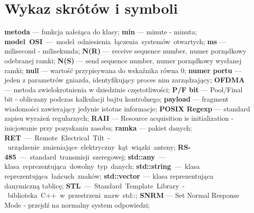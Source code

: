 \chapter*{Wykaz skrótów i symboli}
\noindent
\textbf{metoda} --- funkcja należąca do klasy;\newline
\textbf{min} --- minute - minuta;\newline
\textbf{model OSI} --- model odniesienia łączenia systemów otwartych;\newline
\textbf{ms} --- milisecond - milisekunda;\newline
\textbf{N(R)} --- receive sequence number, numer porządkowy odebranej ramki;\newline
\textbf{N(S)} --- send sequence number, numer porządkowy wysłanej ramki;\newline
\textbf{null} --- wartość przypisywana do wskaźnika równa 0;\newline
\textbf{numer portu} --- jeden z parametrów gniazda, identyfikujący proces nim zarządzający;\newline
\textbf{OFDMA} --- metoda zwielokrotnienia w dziedzinie częstotliwości;\newline
\textbf{P/F bit} --- Pool/Final bit - obliczany podczas kalkulacji bajtu kontrolnego;\newline
\textbf{payload} --- fragment wiadomości zawierający jedynie istotne informacje;\newline
\textbf{POSIX Regexp} --- standard zapisu wyrażeń regularnych;\newline
\textbf{RAII} --- Resource acquisition is initialization - inicjowanie przy pozyskaniu zasobu;\newline
\textbf{ramka} --- pakiet danych;\newline
\textbf{RET} --- Remote Electrical Tilt - urządzenie zmieniające elektryczny kąt wiązki anteny;\newline
\textbf{RS-485} --- standard transmisji szeregowej;\newline
\textbf{std::any} --- klasa reprezentująca dowolny typ danych;\newline
\textbf{std::string} --- klasa reprezentująca łańcuch znaków;\newline
\textbf{std::vector} --- klasa reprezentująca danymiczną tablicę;\newline
\textbf{STL} --- Standard Template Library - biblioteka C++ w przestrzeni nazw std::;\newline
\textbf{SNRM} --- Set Normal Response Mode - przejdź na normalny system odpowiedzi;\newline
